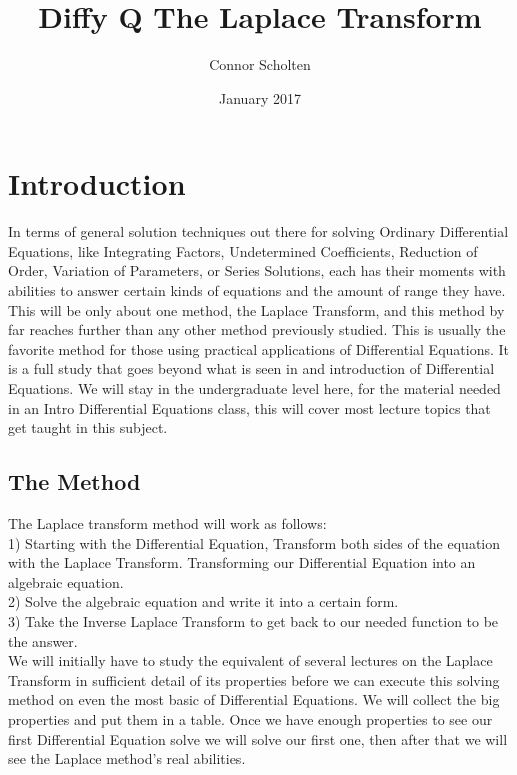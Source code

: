 \documentclass[12pt]{article}
\title{Diffy Q The Laplace Transform}
\author{Connor Scholten}
\date{January 2017}
\begin{document}
\maketitle

\pagebreak

\tableofcontents

\pagebreak

\section{Introduction}

In terms of general solution techniques out there for solving Ordinary Differential Equations, like Integrating Factors, Undetermined Coefficients, Reduction of Order, Variation of Parameters, or Series Solutions, each has their moments with abilities to answer certain kinds of equations and the amount of range they have. This will be only about one method, the Laplace Transform, and this method by far reaches further than any other method previously studied. This is usually the favorite method for those using practical applications of Differential Equations. It is a full study that goes beyond what is seen in and introduction of Differential Equations. We will stay in the undergraduate level here, for the material needed in an Intro Differential Equations class, this will cover most lecture topics that get taught in this subject.

\subsection{The Method}

The Laplace transform method will work as follows: \\

1) Starting with the Differential Equation, Transform both sides of the equation with the Laplace Transform. Transforming our Differential Equation into an algebraic equation. \\

2) Solve the algebraic equation and write it into a certain form. \\

3) Take the Inverse Laplace Transform to get back to our needed function to be the answer. \\

We will initially have to study the equivalent of several lectures on the Laplace Transform in sufficient detail of its properties before we can execute this solving method on even the most basic of Differential Equations. We will collect the big properties and put them in a table. Once we have enough properties to see our first Differential Equation solve we will solve our first one, then after that we will see the Laplace method's real abilities. \\
\end{document}
